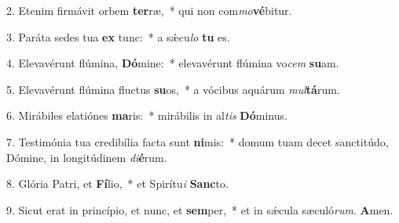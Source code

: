 
2. Etenim firmávit orbem \textbf{ter}ræ,~* qui non com\textit{mo}\textbf{vé}bitur.

3. Paráta sedes tua \textbf{ex} tunc:~* a s\'{\ae}cu\textit{lo} \textbf{tu} es.

4. Elevavérunt flúmina, \textbf{Dó}mine:~* elevavérunt flúmina vo\textit{cem} \textbf{su}am.

5. Elevavérunt flúmina fluctus \textbf{su}os,~* a vócibus aquárum \textit{mul}\textbf{tá}rum.

6. Mirábiles elatiónes \textbf{ma}ris:~* mirábilis in al\textit{tis} \textbf{Dó}minus.

7. Testimónia tua credibília facta sunt \textbf{ni}mis:~* domum tuam decet sanctitúdo, Dómine, in longitúdinem \textit{di}\textbf{é}rum.

8. Glória Patri, et \textbf{Fí}lio,~* et Spirítu\textit{i} \textbf{Sanc}to.

9. Sicut erat in princípio, et nunc, et \textbf{sem}per,~* et in s\'{\ae}cula sæculó\textit{rum}. \textbf{A}men.